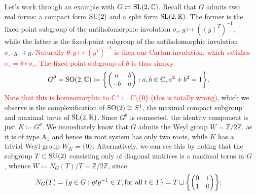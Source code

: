 \noindent\begin{example} %
Let's work through an example with $G \coloneqq \textnormal{SL}(2, \mathbb{C})$. Recall that $G$ admits two real forms: a compact form $\textnormal{SU}(2)$ and a split form $\textnormal{SL}(2, \mathbb{R})$. The former is the fixed-point subgroup of the antiholomorphic involution $\sigma_c : g \mapsto ((\overline{g})^T)^{-1}$, while the latter is the fixed-point subgroup of the antiholomorphic involution $\sigma_s : g \mapsto \overline{g}$. \textcolor{red}{Naturally $\theta : g \mapsto (g^T)^{-1}$ is then our Cartan involution, which satisfies $\sigma_s = \theta \circ \sigma_c$. The fixed-point subgroup of $\theta$ is thus simply}
\begin{align*}
\begin{split}
G^\theta = \textnormal{SO}(2, \mathbb{C}) \coloneqq \left\{\begin{pmatrix}a&b\\-b&a\end{pmatrix} : a, b \in \mathbb{C}, a^2 + b^2 = 1\right\}\!.
\end{split}
\end{align*}
\noindent \textcolor{red}{Note that this is homeomorphic to $\mathbb{C}^\times \coloneqq \mathbb{C}\!\setminus\!\{0\}$ (this is totally wrong)}, which we observe is the complexification of $\textnormal{SO}(2) \cong S^1$, the maximal compact subgroup and maximal torus of $\textnormal{SL}(2, \mathbb{R})$. Since $G^\theta$ is connected, the identity component is just $K \coloneqq G^\theta$. We immediately know that $G$ admits the Weyl group $W = \mathbb{Z}/2\mathbb{Z}$, as it is of type $\text{A}_1$ and hence its root system has only two roots, while $K$ has a trivial Weyl group $W_K = \{0\}$. Alternatively, we can see this by noting that the subgroup $T \subset \textnormal{SU}(2)$ consisting only of diagonal matrices is a maximal torus in $G$, whence $W \coloneqq N_G(T)/T = \mathbb{Z}/2\mathbb{Z}$, since
\begin{align*}
\begin{split}
N_G(T) = \{g \in G : gtg^{-1} \in T, \textnormal{for all $t \in T$}\} = T \sqcup \left\{\begin{pmatrix}0&1\\1&0\end{pmatrix}\right\}\!;
\end{split}

\end{align*}
\end{example}
